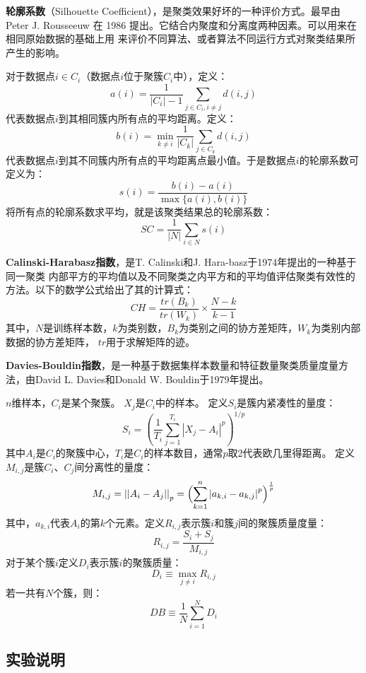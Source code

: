 \documentclass{acm_proc_article-sp}
\begin{document}
\textbf{轮廓系数}（Silhouette Coefficient），是聚类效果好坏的一种评价方式。最早由Peter J. 
Rousseeuw 在 1986 提出。它结合内聚度和分离度两种因素。可以用来在相同原始数据的基础上用
来评价不同算法、或者算法不同运行方式对聚类结果所产生的影响。

对于数据点$i \in C_i$（数据点$i$位于聚簇$C_i$中），定义：
$$a(i) = \frac{1}{|C_i| - 1} \sum_{j \in C_i, i \neq j} d(i, j)$$
代表数据点$i$到其相同簇内所有点的平均距离。定义：
$$b(i) = \min_{k \neq i} \frac{1}{|C_k|} \sum_{j \in C_k} d(i, j)$$
代表数据点$i$到其不同簇内所有点的平均距离点最小值。于是数据点$i$的轮廓系数可定义为：
$$s(i) = \frac{b(i) - a(i)}{\max\{a(i),b(i)\}}$$
将所有点的轮廓系数求平均，就是该聚类结果总的轮廓系数：
$$\mathit{SC}=\frac{1}{|N|} \sum_{i\in N} s(i)$$

\textbf{Calinski-Harabasz指数}，是T. Calinski和J. Hara-basz于1974年提出的一种基于同一聚类
内部平方的平均值以及不同聚类之内平方和的平均值评估聚类有效性的方法。以下的数学公式给出了其的计算式：
$$\mathit{CH} = \frac{ tr(B_k) }{ tr(W_k) } \times \frac{ N-k }{ k-1 }$$
其中，$N$是训练样本数，$k$为类别数，$B_k$为类别之间的协方差矩阵，$W_k$为类别内部数据的协方差矩阵，
$tr$用于求解矩阵的迹。

\textbf{Davies-Bouldin指数}，是一种基于数据集样本数量和特征数量聚类质量度量方法，由David L. 
Davies和Donald W. Bouldin于1979年提出。

$n$维样本，$C_i$是某个聚簇。 $X_j$是$C_i$中的样本。 定义$S_i$是簇内紧凑性的量度：
$$S_i = \left(\frac{1}{T_i} \sum_{j=1}^{T_i} {\left| X_j-A_i\right|^p}\right)^{1/p}$$
其中$A_i$是$C_i$的聚簇中心，$T_i$是$C_i$的样本数目，通常$p$取2代表欧几里得距离。
定义$M_{i,j}$是簇$C_i$、$C_j$间分离性的量度：
$$M_{i,j} = \left|\left|A_i-A_j\right|\right|_p = \Bigl(\displaystyle\sum_{k=1}^{n}\left|a_{k,i}-a_{k,j}\right|^p\Bigr)^{\frac 1 p}$$
其中，$a_{k,i}$代表$A_i$的第$k$个元素。定义$R_{i,j}$表示簇$i$和簇$j$间的聚簇质量度量：
$$R_{i,j} = \frac{S_i + S_j}{M_{i,j}}$$
对于某个簇$i$定义$D_i$表示簇$i$的聚簇质量：
$$D_i \equiv \max_{j \neq i} R_{i,j}$$
若一共有$N$个簇，则：
$$\mathit{DB} \equiv \frac{1}{N}\displaystyle\sum_{i=1}^N D_i$$

\subsection{\textsf{实验说明}}
\end{document}
